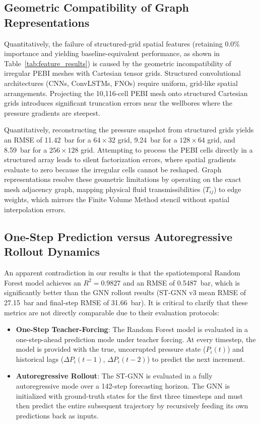 \documentclass[10pt,twocolumn]{article}
\begin{document}
\subsection{Geometric Compatibility of Graph Representations}
Quantitatively, the failure of structured-grid spatial features (retaining 0.0\% importance and yielding baseline-equivalent performance, as shown in Table~\ref{tab:feature_results}) is caused by the geometric incompatibility of irregular PEBI meshes with Cartesian tensor grids. Structured convolutional architectures (CNNs, ConvLSTMs, FNOs) require uniform, grid-like spatial arrangements. Projecting the 10,116-cell PEBI mesh onto structured Cartesian grids introduces significant truncation errors near the wellbores where the pressure gradients are steepest. 

Quantitatively, reconstructing the pressure snapshot from structured grids yields an RMSE of 11.42~bar for a $64 \times 32$ grid, 9.24~bar for a $128 \times 64$ grid, and 8.59~bar for a $256 \times 128$ grid. Attempting to process the PEBI cells directly in a structured array leads to silent factorization errors, where spatial gradients evaluate to zero because the irregular cells cannot be reshaped. Graph representations resolve these geometric limitations by operating on the exact mesh adjacency graph, mapping physical fluid transmissibilities ($T_{ij}$) to edge weights, which mirrors the Finite Volume Method stencil without spatial interpolation errors.

\subsection{One-Step Prediction versus Autoregressive Rollout Dynamics}
An apparent contradiction in our results is that the spatiotemporal Random Forest model achieves an $R^2 = 0.9827$ and an RMSE of 0.5487~bar, which is significantly better than the GNN rollout results (ST-GNN v3 mean RMSE of 27.15~bar and final-step RMSE of 31.66~bar). It is critical to clarify that these metrics are not directly comparable due to their evaluation protocols:
\begin{itemize}
    \item \textbf{One-Step Teacher-Forcing}: The Random Forest model is evaluated in a one-step-ahead prediction mode under teacher forcing. At every timestep, the model is provided with the true, uncorrupted pressure state ($P_i(t)$) and historical lags ($\Delta P_i(t-1)$, $\Delta P_i(t-2)$) to predict the next increment.
    \item \textbf{Autoregressive Rollout}: The ST-GNN is evaluated in a fully autoregressive mode over a 142-step forecasting horizon. The GNN is initialized with ground-truth states for the first three timesteps and must then predict the entire subsequent trajectory by recursively feeding its own predictions back as inputs.
\end{itemize}
\end{document}
